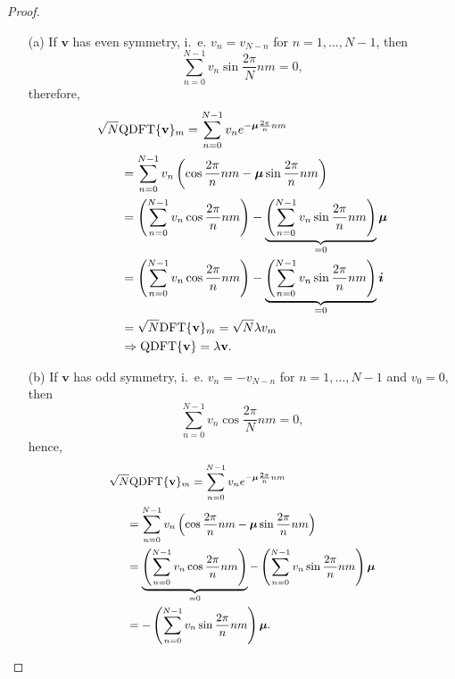 \begin{proof}
\begin{itemize}
\item[(a)] If $ \mathbf{v} $ has even symmetry, i.~e. $ v_n = v_{N-n} $ for $ n=1,\dots,N-1 $, then
\begin{equation}
\sum_{n=0}^{N-1} v_n \sin \frac{2\pi}{N} nm = 0,
\end{equation}
therefore,
\newcommand{\correctinghspace}{-1.8cm}
\begin{equation}
\label{eq:15}
\begin{aligned}
\sqrt{N} \text{QDFT}\{ \mathbf{v} \}_m &= \sum_{n=0}^{N-1} v_n e^{-\qmu \frac{2\pi}{n} nm} \\
&\hspace{\correctinghspace}
=\sum_{n=0}^{N-1} v_n \left( \cos \frac{2\pi}{n} nm - \qmu \sin \frac{2\pi}{n} nm \right) \\
&\hspace{\correctinghspace}
= \left( \sum_{n=0}^{N-1} v_n \cos \frac{2\pi}{n} nm \right) - \underbrace{\left(  \sum_{n=0}^{N-1} v_n \sin \frac{2\pi}{n} nm \right)}_{=0} \qmu \\
&\hspace{\correctinghspace}
= \left( \sum_{n=0}^{N-1} v_n \cos \frac{2\pi}{n} nm \right) - \underbrace{\left(  \sum_{n=0}^{N-1} v_n \sin \frac{2\pi}{n} nm \right)}_{=0} \qi \\
&\hspace{\correctinghspace}
= \sqrt{N} \text{DFT}\{ \mathbf{v} \}_m = \sqrt{N} \lambda v_m \\
&\hspace{\correctinghspace}
\Rightarrow \text{QDFT}\{ \mathbf{v} \} = \lambda \mathbf{v}.
\end{aligned}
\end{equation}
\item[(b)] If $ \mathbf{v} $ has odd symmetry, i.~e. $ v_n = -v_{N-n} $ for $ n=1,\dots,N-1 $ and $ v_0 = 0 $, then
\begin{equation}
\sum_{n=0}^{N-1} v_n \cos \frac{2\pi}{N} nm = 0,
\end{equation}
hence,
\begin{equation}
\small
\label{eq:17}
\begin{aligned}
\sqrt{N} \text{QDFT}\{ \mathbf{v} \}_m &= \sum_{n=0}^{N-1} v_n e^{-\qmu \frac{2\pi}{n} nm}\\
&\hspace{\correctinghspace}
=
\sum_{n=0}^{N-1} v_n \left( \cos \frac{2\pi}{n} nm - \qmu \sin \frac{2\pi}{n} nm \right) \\
&\hspace{\correctinghspace}
= {\underbrace{\left( \sum_{n=0}^{N-1} v_n \cos \frac{2\pi}{n} nm \right)}_{=0} - \left(  \sum_{n=0}^{N-1} v_n \sin \frac{2\pi}{n} nm \right) \qmu }\\
&\hspace{\correctinghspace}
= - \left(  \sum_{n=0}^{N-1} v_n \sin \frac{2\pi}{n} nm \right) \qmu.
\end{aligned}
\end{equation}


\end{itemize}
\end{proof}
